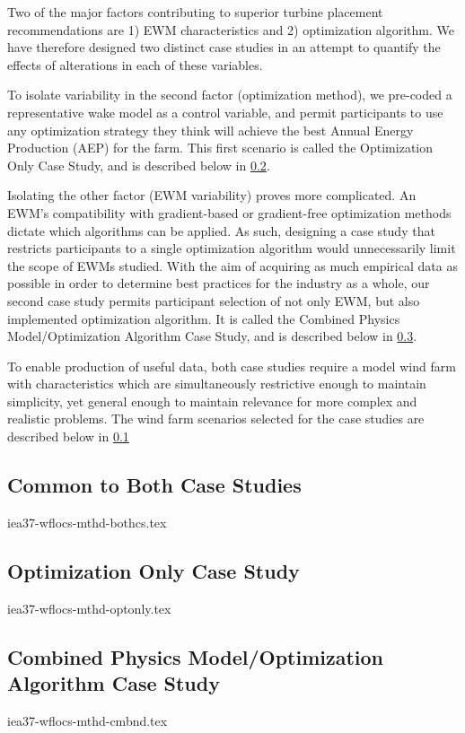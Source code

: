 			

Two of the major factors contributing to superior turbine placement recommendations are
1) EWM characteristics and 2) optimization algorithm.
We have therefore designed two distinct case studies in an attempt to quantify the effects of alterations in each of these variables.

To isolate variability in the second factor (optimization method), we pre-coded a representative wake model as a control variable,
and permit participants to use any optimization strategy they think will achieve the best Annual Energy Production (AEP) for the farm.
This first scenario is called the Optimization Only Case Study, and is described below in \cref{sec:optonly}.

Isolating the other factor (EWM variability) proves more complicated.
An EWM's compatibility with gradient-based or gradient-free optimization methods dictate which algorithms can be applied.
As such, designing a case study that restricts participants to a single optimization algorithm would unnecessarily limit the scope of EWMs studied.
With the aim of acquiring as much empirical data as possible in order to determine best practices for the industry as a whole,
our second case study permits participant selection of not only EWM, but also implemented optimization algorithm.
It is called the Combined Physics Model/Optimization Algorithm Case Study, and is described below in \cref{sec:cmbnd}.

To enable production of useful data, both case studies require a model wind farm with characteristics which are simultaneously restrictive enough to maintain simplicity, yet general enough to maintain relevance for more complex and realistic problems.
The wind farm scenarios selected for the case studies are described below in \cref{sec:windfarm}
\bigskip
\subsection{Common to Both Case Studies} \label{sec:windfarm}

	{iea37-wflocs-mthd-bothcs.tex}
	
\subsection{Optimization Only Case Study} \label{sec:optonly}

	{iea37-wflocs-mthd-optonly.tex}

\subsection{Combined Physics Model/Optimization Algorithm Case Study} \label{sec:cmbnd}

	{iea37-wflocs-mthd-cmbnd.tex}